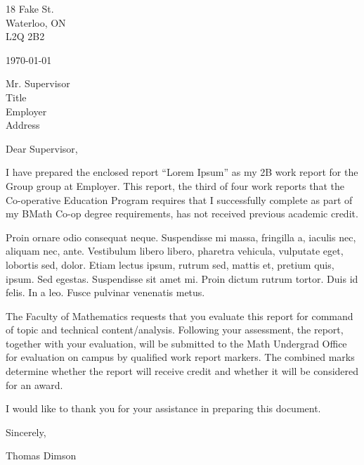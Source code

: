\documentclass[12pt]{article}
\begin{document}



\begin{waterlooletter}
18 Fake St.\\
Waterloo, ON\\
L2Q 2B2

\today

Mr. Supervisor\\
Title\\
Employer\\
Address

Dear Supervisor,

I have prepared the enclosed report ``Lorem Ipsum'' as my 2B work report for the Group group at Employer. This report, the third of four work reports that the Co-operative Education Program requires that I successfully complete as part of my BMath Co-op degree requirements, has not received previous academic credit.

Proin ornare odio consequat neque. Suspendisse mi massa, fringilla a, iaculis nec, aliquam nec, ante. Vestibulum libero libero, pharetra vehicula, vulputate eget, lobortis sed, dolor. Etiam lectus ipsum, rutrum sed, mattis et, pretium quis, ipsum. Sed egestas. Suspendisse sit amet mi. Proin dictum rutrum tortor. Duis id felis. In a leo. Fusce pulvinar venenatis metus.

The Faculty of Mathematics requests that you evaluate this report for command of topic and technical content/analysis. Following your assessment, the report, together with your evaluation, will be submitted to the Math Undergrad Office for evaluation on campus by qualified work report markers. The combined marks determine whether the report will receive credit and whether it will be considered for an award.

I would like to thank you for your assistance in preparing this document.

Sincerely,\\

\vspace{1.5em}

Thomas Dimson
\end{waterlooletter}
\end{document}
